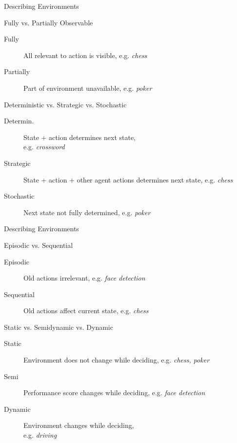 \documentclass[14pt]{beamer}
\begin{document}
\begin{frame}{Describing Environments}
\begin{block}{Fully vs. Partially Observable}
\begin{description}
\item[Fully] All relevant to action is visible, e.g. \textit{chess}
\item[Partially] Part of environment unavailable, e.g. \textit{poker}
\end{description}
\end{block}
\begin{block}{Deterministic vs. Strategic vs. Stochastic}
\begin{description}
\item[Determin.] State + action determines next state, \\ e.g. \textit{crossword}
\item[Strategic] State + action + other agent actions determines next state, e.g. \textit{chess}
\item[Stochastic] Next state not fully determined, e.g. \textit{poker}
\end{description}
\end{block}
\end{frame}
\begin{frame}{Describing Environments}
\begin{block}{Episodic vs. Sequential}
\begin{description}
\item[Episodic] Old actions irrelevant, e.g. \textit{face detection}
\item[Sequential] Old actions affect current state, e.g. \textit{chess}
\end{description}
\end{block}
\begin{block}{Static vs. Semidynamic vs. Dynamic}
\begin{description}
\item[Static] Environment does not change while deciding, e.g. \textit{chess, poker}
\item[Semi] Performance score changes while deciding, e.g. \textit{face detection}
\item[Dynamic] Environment changes while deciding, \\ e.g. \textit{driving}
\end{description}
\end{block}
\end{frame}
\end{document}
